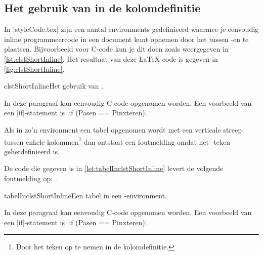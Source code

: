 	\subsection{\texorpdfstring{Het gebruik van \code{\|} in de kolomdefinitie}{Het gebruik van | in de kolomdefinitie}}
\begin{llstShortInline}
	In |styleCode.tex| zijn een aantal environments gedefinieerd waarmee je eenvoudig inline programmeercode in een document kunt opnemen door het tussen \code{\|}-en te plaatsen.
	Bijvoorbeeld voor C-code kun je dit doen zoals weergegeven in \cref{lst:clstShortInline}.
	Het resultaat van deze \LaTeX{}-code is gegeven in \cref{fig:clstShortInline}.

\begin{floatlst}[style=lstyle]{clstShortInline}{Het gebruik van .}
\begin{clstShortInline}
	In deze paragraaf kan eenvoudig C-code opgenomen worden.
	Een voorbeeld van een |if|-statement is |if (Pasen == Pinxteren)|.
\end{clstShortInline}
\end{floatlst}

		
	Als in zo'n environment een tabel opgenomen wordt met een verticale streep tussen enkele kolommen\footnote{%
		Door het teken \code{\|} op te nemen in de kolomdefinitie.
	} dan ontstaat een foutmelding omdat het \code{\|}-teken geherdefinieerd is.
	
	De code die gegeven is in \cref{lst:tabelInclstShortInline} levert de volgende foutmelding op:
	.
	
\begin{floatlst}[style=lstyle]{tabelInclstShortInline}{Een tabel in een -environment.}
\begin{clstShortInline}
	In deze paragraaf kan eenvoudig C-code opgenomen worden.
	Een voorbeeld van een |if|-statement is |if (Pasen == Pinxteren)|.
\end{clstShortInline}
\end{floatlst}


\end{llstShortInline}
